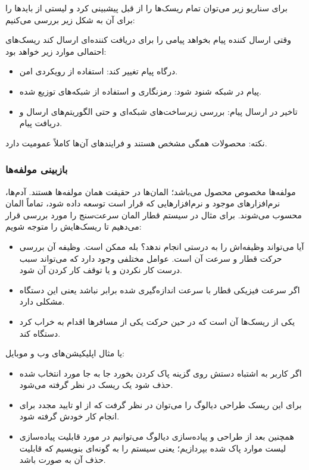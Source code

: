 برای سناریو زیر می‌توان تمام ریسک‌ها را از قبل پیشبینی کرد و لیستی از باید‌ها را
برای آن به شکل زیر بررسی می‌کنیم:

وقتی ارسال کننده پیام بخواهد پیامی را برای دریافت کننده‌ای ارسال کند ریسک‌های
احتمالی موارد زیر خواهد بود:

\begin{itemize}
    \item درگاه پیام تغییر کند: استفاده از رویکردی امن.
    \item پیام در شبکه شنود شود: رمزنگاری و استفاده از شبکه‌های توزیع شده.
    \item تاخیر در ارسال پیام: بررسی زیرساخت‌های شبکه‌ای و حتی الگوریتم‌های
    ارسال و دریافت پیام.
\end{itemize}

نکته: محصولات همگی مشخص هستند و فرایند‌های آن‌ها کاملاً عمومیت دارد.

\subsubsection{بازبینی مولفه‌ها}

مولفه‌ها مخصوص محصول می‌باشد؛ المان‌ها در حقیقت همان مولفه‌ها هستند. آدم‌ها،
نرم‌افزار‌های موجود و نرم‌افزار‌هایی که قرار است توسعه داده شود، تماماً المان
محسوب می‌شوند. برای مثال در سیستم قطار المان سرعت‌سنج را مورد بررسی قرار می‌دهیم
تا ریسک‌هایش را متوجه شویم:

\begin{itemize}
    \item آیا می‌تواند وظیفه‌اش را به درستی انجام ندهد؟ بله ممکن است. وظیفه‌ آن
    بررسی حرکت قطار و سرعت آن است. عوامل مختلفی وجود دارد که می‌تواند سبب درست
    کار نکردن و یا توقف کار کردن آن شود.
    \item اگر سرعت فیزیکی قطار با سرعت اندازه‌گیری شده برابر نباشد یعنی این
    دستگاه مشکلی دارد.
    \item یکی از ریسک‌ها آن است که در حین حرکت یکی از مسافر‌ها اقدام به خراب کرد
    دستگاه کند.
\end{itemize}

یا مثال اپلیکیشن‌های وب و موبایل:

\begin{itemize}
    \item اگر کاربر به اشتباه دستش روی گزینه پاک کردن بخورد جا به جا مورد انتخاب
    شده حذف شود یک ریسک در نظر گرفته می‌شود.
    \item برای این ریسک طراحی دیالوگ را می‌توان در نظر گرفت که از او تایید مجدد
    برای انجام کار خودش گرفته شود.
    \item همچنین بعد از طراحی و پیاده‌سازی دیالوگ می‌توانیم در مورد قابلیت
    پیاده‌سازی لیست موارد پاک شده بپردازیم؛ یعنی سیستم را به گونه‌ای بنویسیم که
    قابلیت حذف آن به صورت  باشد.
\end{itemize}

